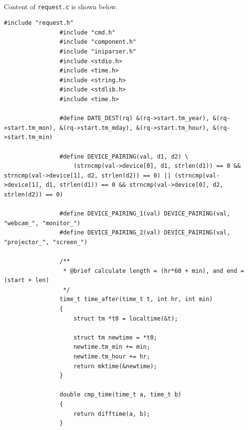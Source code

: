 \documentclass{article}
\begin{document}
            \paragraph{}
                Content of \texttt{request.c} is shown below.
            \begin{Verbatim}[gobble=8]
                #include "request.h"
                #include "cmd.h"
                #include "component.h"
                #include "iniparser.h"
                #include <stdio.h>
                #include <time.h>
                #include <string.h>
                #include <stdlib.h>
                #include <time.h>
                
                #define DATE_DEST(rq) &(rq->start.tm_year), &(rq->start.tm_mon), &(rq->start.tm_mday), &(rq->start.tm_hour), &(rq->start.tm_min)
                
                #define DEVICE_PAIRING(val, d1, d2) \
                    (strncmp(val->device[0], d1, strlen(d1)) == 0 && strncmp(val->device[1], d2, strlen(d2)) == 0) || (strncmp(val->device[1], d1, strlen(d1)) == 0 && strncmp(val->device[0], d2, strlen(d2)) == 0)
                
                #define DEVICE_PAIRING_1(val) DEVICE_PAIRING(val, "webcam_", "monitor_")
                #define DEVICE_PAIRING_2(val) DEVICE_PAIRING(val, "projector_", "screen_")
                
                /**
                 * @brief calculate length = (hr*60 + min), and end = (start + len)
                 */
                time_t time_after(time_t t, int hr, int min)
                {
                    struct tm *t0 = localtime(&t);
                
                    struct tm newtime = *t0;
                    newtime.tm_min += min;
                    newtime.tm_hour += hr;
                    return mktime(&newtime);
                }
                
                double cmp_time(time_t a, time_t b)
                {
                    return difftime(a, b);
                }
                

\end{Verbatim}
\end{document}
